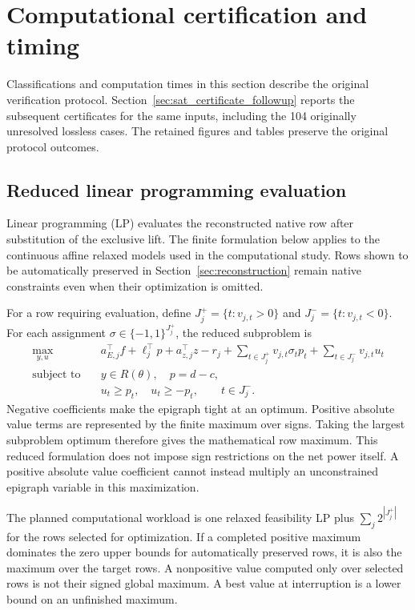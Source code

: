 \section{Computational certification and timing}\label{sec:computation}


Classifications and computation times in this section describe the original
verification protocol. Section~\ref{sec:sat_certificate_followup} reports the
subsequent certificates for the same inputs, including the 104 originally
unresolved lossless cases. The retained figures and tables preserve the
original protocol outcomes.

\subsection{Reduced linear programming evaluation}
Linear programming (LP) evaluates the reconstructed native row after
substitution of the exclusive lift. The finite formulation below applies to
the continuous affine relaxed models used in the computational study.
Rows shown to be automatically preserved in Section~\ref{sec:reconstruction}
remain native constraints even when their optimization is omitted.

For a row requiring evaluation, define $J_j^+=\{t:v_{j,t}>0\}$ and
$J_j^-=\{t:v_{j,t}<0\}$. For each assignment
$\sigma\in\{-1,1\}^{J_j^+}$, the reduced subproblem is
\begin{equation}
\begin{aligned}
\max_{y, u}\quad & a_{E, j}^\top f+\ell_j^\top p+a_{z, j}^\top z-r_j
 +\sum_{t\in J_j^+}v_{j, t}\sigma_tp_t
 +\sum_{t\in J_j^-}v_{j, t}u_t\\
\text{subject to}\quad &y\in R(\theta),\quad p=d-c,\\
&u_t\geq p_t,\quad u_t\geq-p_t,\qquad t\in J_j^-.
\end{aligned}\label{eq:reduced_lp}
\end{equation}
Negative coefficients make the epigraph tight at an optimum. Positive
absolute value terms are represented by the finite maximum over signs.
Taking the largest subproblem optimum therefore gives the mathematical row
maximum. This reduced formulation does not impose sign restrictions on
the net power itself. A positive absolute value coefficient cannot instead
multiply an unconstrained epigraph variable in this maximization.

The planned computational workload is one relaxed feasibility LP plus
$\sum_j2^{|J_j^+|}$ for the rows selected for optimization. If a completed
positive maximum dominates the zero upper bounds for automatically
preserved rows, it is also the maximum over the target rows. A nonpositive
value computed only over selected rows is not their signed global maximum.
A best value at interruption is a lower bound on an unfinished maximum.

